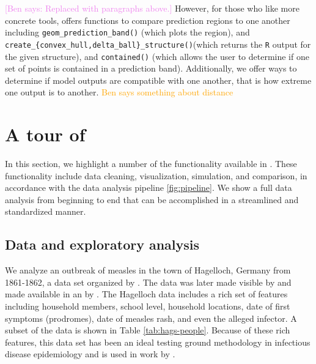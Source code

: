 \documentclass[
  shortnames]{jss}
\begin{document}
\textcolor{violet}{[Ben says: Replaced with paragraphs above.]} However,
for those who like more concrete tools,  offers
functions to compare prediction regions to one another including
\texttt{geom\_prediction\_band()} (which plots the region), and
\texttt{create\_\{convex\_hull,delta\_ball\}\_structure()}(which returns
the \texttt{R} output for the given structure), and \texttt{contained()}
(which allows the user to determine if one set of points is contained in
a prediction band). Additionally, we offer ways to determine if model
outputs are compatible with one another, that is how extreme one output
is to another. \textcolor{orange}{Ben says something about distance}

\section[Tour]{A tour of }\label{sec:tour}

In this section, we highlight a number of the functionality available in
. These functionality include data cleaning,
visualization, simulation, and comparison, in accordance with the data
analysis pipeline \ref{fig:pipeline}. We show a full data analysis from
beginning to end that can be accomplished in a streamlined and
standardized manner.

\subsection{Data and exploratory analysis}

We analyze an outbreak of measles in the town of Hagelloch, Germany from
1861-1862, a data set organized by \cite{pfeilsticker1863}. The data was
later made visible by \cite{oesterle1992} and made available in an
 by \cite{surveillance2017}. The Hagelloch data includes a
rich set of features including household members, school level,
household locations, date of first symptoms (prodromes), date of measles
rash, and even the alleged infector. A subset of the data is shown in
Table \ref{tab:hags-people}. Because of these rich features, this data
set has been an ideal testing ground methodology in infectious disease
epidemiology and is used in work by
\cite{Neal2004,britton2011,groendyke2012,becker2016}.
\end{document}
